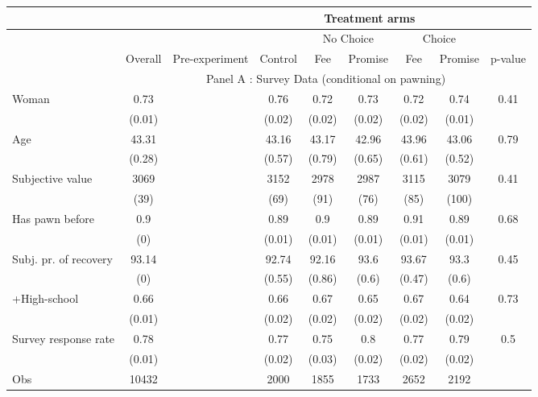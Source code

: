 \begin{tabular}{lcccccccc}
\toprule
      &       &       & \multicolumn{5}{c}{Treatment arms}    &  \\
\midrule
      &       &       &       & \multicolumn{2}{c}{No Choice } & \multicolumn{2}{c}{Choice} &  \\
\midrule
\midrule
      & Overall & Pre-experiment & Control & Fee   & Promise & Fee   & Promise & p-value \\
\midrule
      & \multicolumn{8}{c}{Panel A : Survey Data (conditional on pawning)} \\
\midrule
\midrule
Woman & 0.73  &       & 0.76  & 0.72  & 0.73  & 0.72  & 0.74  & 0.41 \\
      & (0.01) &       & (0.02) & (0.02) & (0.02) & (0.02) & (0.01) &  \\
Age   & 43.31 &       & 43.16 & 43.17 & 42.96 & 43.96 & 43.06 & 0.79 \\
      & (0.28) &       & (0.57) & (0.79) & (0.65) & (0.61) & (0.52) &  \\
Subjective value & 3069  &       & 3152  & 2978  & 2987  & 3115  & 3079  & 0.41 \\
      & (39)  &       & (69)  & (91)  & (76)  & (85)  & (100) &  \\
Has pawn before & 0.9   &       & 0.89  & 0.9   & 0.89  & 0.91  & 0.89  & 0.68 \\
      & (0)   &       & (0.01) & (0.01) & (0.01) & (0.01) & (0.01) &  \\
Subj. pr. of recovery & 93.14 &       & 92.74 & 92.16 & 93.6  & 93.67 & 93.3  & 0.45 \\
      & (0)   &       & (0.55) & (0.86) & (0.6) & (0.47) & (0.6) &  \\
+High-school & 0.66  &       & 0.66  & 0.67  & 0.65  & 0.67  & 0.64  & 0.73 \\
      & (0.01) &       & (0.02) & (0.02) & (0.02) & (0.02) & (0.02) &  \\
Survey response rate & 0.78  &       & 0.77  & 0.75  & 0.8   & 0.77  & 0.79  & 0.5 \\
      & (0.01) &       & (0.02) & (0.03) & (0.02) & (0.02) & (0.02) &  \\
\midrule
Obs   & 10432 &       & 2000  & 1855  & 1733  & 2652  & 2192  &  \\
\bottomrule
\bottomrule
\end{tabular}%
